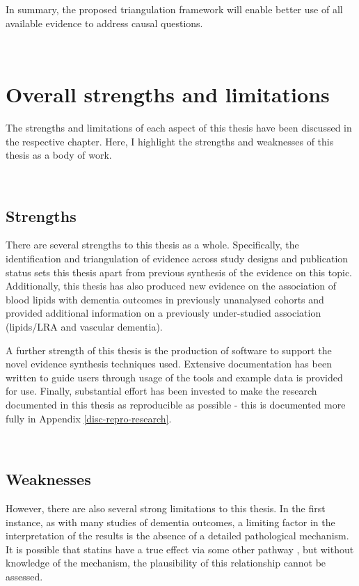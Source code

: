 \documentclass[a4paper, twoside]{templates/ociamthesis}
\begin{document}
In summary, the proposed triangulation framework will enable better use of all available evidence to address causal questions.

~

\hypertarget{overall-strengths-and-limitations}{%
\section{Overall strengths and limitations}\label{overall-strengths-and-limitations}}

The strengths and limitations of each aspect of this thesis have been discussed in the respective chapter. Here, I highlight the strengths and weaknesses of this thesis as a body of work.

~

\hypertarget{strengths-3}{%
\subsection{Strengths}\label{strengths-3}}

There are several strengths to this thesis as a whole. Specifically, the identification and triangulation of evidence across study designs and publication status sets this thesis apart from previous synthesis of the evidence on this topic. Additionally, this thesis has also produced new evidence on the association of blood lipids with dementia outcomes in previously unanalysed cohorts and provided additional information on a previously under-studied association (lipids/LRA and vascular dementia).

A further strength of this thesis is the production of software to support the novel evidence synthesis techniques used. Extensive documentation has been written to guide users through usage of the tools and example data is provided for use. Finally, substantial effort has been invested to make the research documented in this thesis as reproducible as possible - this is documented more fully in Appendix \ref{disc-repro-research}.

~

\hypertarget{weaknesses}{%
\subsection{Weaknesses}\label{weaknesses}}

However, there are also several strong limitations to this thesis. In the first instance, as with many studies of dementia outcomes, a limiting factor in the interpretation of the results is the absence of a detailed pathological mechanism. It is possible that statins have a true effect via some other pathway , but without knowledge of the mechanism, the plausibility of this relationship cannot be assessed.
\end{document}
